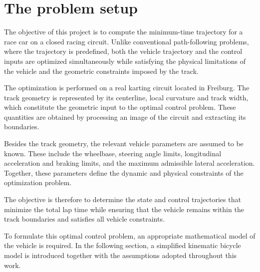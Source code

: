 \section{The problem setup}

The objective of this project is to compute the minimum-time trajectory for a race car on a closed racing circuit. Unlike conventional path-following problems, where the trajectory is predefined, both the vehicle trajectory and the control inputs are optimized simultaneously while satisfying the physical limitations of the vehicle and the geometric constraints imposed by the track.

The optimization is performed on a real karting circuit located in Freiburg. The track geometry is represented by its centerline, local curvature and track width, which constitute the geometric input to the optimal control problem. These quantities are obtained by processing an image of the circuit and extracting its boundaries.

Besides the track geometry, the relevant vehicle parameters are assumed to be known. These include the wheelbase, steering angle limits, longitudinal acceleration and braking limits, and the maximum admissible lateral acceleration. Together, these parameters define the dynamic and physical constraints of the optimization problem.

The objective is therefore to determine the state and control trajectories that minimize the total lap time while ensuring that the vehicle remains within the track boundaries and satisfies all vehicle constraints.

To formulate this optimal control problem, an appropriate mathematical model of the vehicle is required. In the following section, a simplified kinematic bicycle model is introduced together with the assumptions adopted throughout this work.
